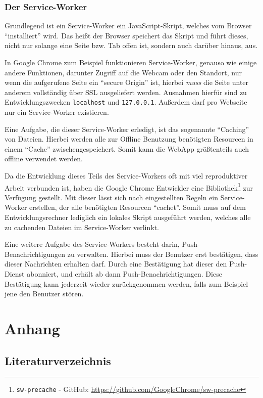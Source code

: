 \documentclass[a4paper,12pt]{scrartcl}      %
\providecommand{\inlinecode}[1]{\texttt{#1}}
\begin{document}
	\subsubsection{Der Service-Worker}
	Grundlegend ist ein Service-Worker ein JavaScript-Skript, welches vom Browser ``installiert'' wird. Das heißt der Browser speichert das Skript und führt dieses, nicht nur solange eine Seite bzw. Tab offen ist, sondern auch darüber hinaus, aus.\par
	In Google Chrome zum Beispiel funktionieren Service-Worker, genauso wie einige andere Funktionen, darunter Zugriff auf die Webcam oder den Standort, nur wenn die aufgerufene Seite ein ``secure Origin'' ist, hierbei \emph{muss} die Seite unter anderem vollständig über SSL ausgeliefert werden. Ausnahmen hierfür sind zu Entwicklungszwecken \inlinecode{localhost} und \inlinecode{127.0.0.1}. Außerdem darf pro Webseite nur ein Service-Worker existieren.\par
	Eine Aufgabe, die dieser Service-Worker erledigt, ist das sogenannte ``Caching'' von Dateien. Hierbei werden alle zur Offline Benutzung benötigten Resourcen in einem ``Cache'' zwischengespeichert. Somit kann die WebApp größtenteils auch offline verwendet werden.\par
	Da die Entwicklung dieses Teils des Service-Workers oft mit viel reproduktiver Arbeit verbunden ist, haben die Google Chrome Entwickler eine Bibliothek\footnote{\inlinecode{sw-precache} - GitHub: \url{https://github.com/GoogleChrome/sw-precache}} zur Verfügung gestellt. Mit dieser lässt sich nach eingestellten Regeln ein Service-Worker erstellen, der alle benötigten Resourcen ``cachet''. Somit muss auf dem Entwicklungsrechner lediglich ein lokales Skript ausgeführt werden, welches alle zu cachenden Dateien im Service-Worker verlinkt.\par
	Eine weitere Aufgabe des Service-Workers besteht darin, Push-Benachrichtigungen zu verwalten. Hierbei muss der Benutzer erst bestätigen, dass dieser Nachrichten erhalten darf. Durch eine Bestätigung hat dieser den Push-Dienst abonniert, und erhält ab dann Push-Benachrichtigungen. Diese Bestätigung kann jederzeit wieder zurückgenommen werden, falls zum Beispiel jene den Benutzer stören.\par
	\newpage
	\section{Anhang}
	\subsection{Literaturverzeichnis}
	\printbibliography[heading=none]
	
\end{document}
